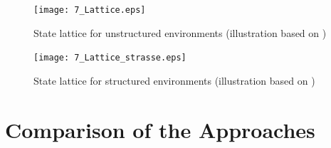 \begin{figure}[h]
\centering
  	\texttt{[image: 7\_Lattice.eps]}
	\caption[State lattice for unstructured environments]{State lattice for unstructured environments (illustration based on \cite{mcnaughton})}
	\label{fig:lattice}
\end{figure}


\begin{figure}[h]
\centering
  	\texttt{[image: 7\_Lattice\_strasse.eps]}
	\caption[State lattice for structured environments]{State lattice for structured environments (illustration based on \cite{McNaughton2011diss})}
	\label{fig:lattice_strasse}
\end{figure}



\section{Comparison of the Approaches}\label{S:57.4}


